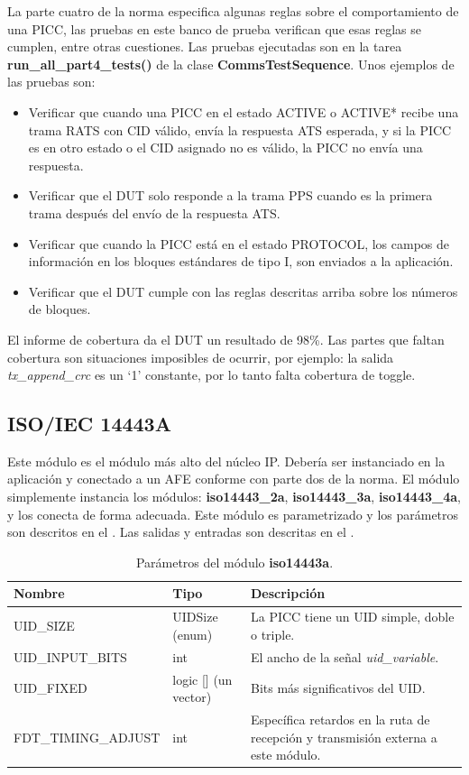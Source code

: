 \documentclass[a4paper, twoside, 11pt]{report}
\begin{document}
La parte cuatro de la norma especifica algunas reglas sobre el comportamiento de una PICC, las pruebas en este banco de prueba verifican que esas reglas se cumplen, entre otras cuestiones. Las pruebas ejecutadas son en la tarea \textbf{run\_all\_part4\_tests()} de la clase \textbf{CommsTestSequence}. Unos ejemplos de las pruebas son:

\begin{itemize}
  \item Verificar que cuando una PICC en el estado ACTIVE o ACTIVE* recibe una trama RATS con CID válido, envía la respuesta ATS esperada, y si la PICC es en otro estado o el CID asignado no es válido, la PICC no envía una respuesta.
  \item Verificar que el DUT solo responde a la trama PPS cuando es la primera trama después del envío de la respuesta ATS.
  \item Verificar que cuando la PICC está en el estado PROTOCOL, los campos de información en los bloques estándares de tipo I, son enviados a la aplicación.
  \item Verificar que el DUT cumple con las reglas descritas arriba sobre los números de bloques.
\end{itemize}

El informe de cobertura da el DUT un resultado de 98\%. Las partes que faltan cobertura son situaciones imposibles de ocurrir, por ejemplo: la salida \textit{tx\_append\_crc} es un ‘1’ constante, por lo tanto falta cobertura de toggle.

\FloatBarrier
\subsection{ISO/IEC 14443A}

Este módulo es el módulo más alto del núcleo IP. Debería ser instanciado en la aplicación y conectado a un AFE conforme con parte dos de la norma. El módulo simplemente instancia los módulos: \textbf{iso14443\_2a}, \textbf{iso14443\_3a}, \textbf{iso14443\_4a}, y los conecta de forma adecuada. Este módulo es parametrizado y los parámetros son descritos en el . Las salidas y entradas son descritas en el .

\begin{table}[htb]
  \centering
  \tablezebra
  \begin{tabulary}{\linewidth}{l|l|L}
    \textbf{Nombre}&\textbf{Tipo}&\textbf{Descripción} \\
    \hline
    UID\_SIZE&UIDSize (enum)&La PICC tiene un UID simple, doble o triple. \\
    UID\_INPUT\_BITS&int&El ancho de la señal \textit{uid\_variable}. \\
    UID\_FIXED&logic [] (un vector)&Bits más significativos del UID. \\
    FDT\_TIMING\_ADJUST&int&Específica retardos en la ruta de recepción y transmisión externa a este módulo. \\
  \end{tabulary}
  \caption{Parámetros del módulo \textbf{iso14443a}.}
  \label{tab:params_iso14443a}
\end{table}
\end{document}
